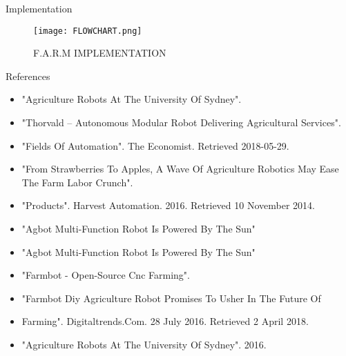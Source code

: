 \documentclass[10pt]{beamer}
\begin{document}
\begin{frame}[t]{ Implementation
	}\label{s2}
	\begin{figure}
		\texttt{[image: FLOWCHART.png]}
		\caption{F.A.R.M  IMPLEMENTATION} 
		\label{fig:mriimage21}
	\end{figure}  
\end{frame}

\begin{frame}[t]{References}\label{s2}
\begin{itemize}
\item  "Agriculture Robots At The University Of Sydney". 
\item  "Thorvald – Autonomous Modular Robot Delivering Agricultural Services".
\item  "Fields Of Automation". The Economist. Retrieved 2018-05-29.
\item "From Strawberries To Apples, A Wave Of Agriculture Robotics May Ease The Farm Labor Crunch".
\item  "Products". Harvest Automation. 2016. Retrieved 10 November 2014.
\item "Agbot Multi-Function Robot Is Powered By The Sun"
\item  "Agbot Multi-Function Robot Is Powered By The Sun"
\item  "Farmbot - Open-Source Cnc Farming". 
\item  "Farmbot Diy Agriculture Robot Promises To Usher In The Future Of \item Farming". Digitaltrends.Com. 28 July 2016. Retrieved 2 April 2018.
\item  "Agriculture Robots At The University Of Sydney". 2016.


\end{itemize}
\end{frame}
\end{document}
